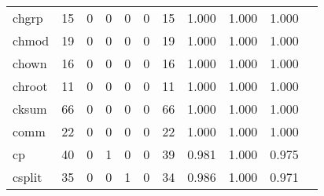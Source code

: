 \begin{longtable}{lp{1.10cm}p{1.10cm}p{1.10cm}p{1.10cm}p{1.10cm}p{1.10cm}p{1.10cm}p{1.10cm}p{1.10cm}p{1.10cm}}
chgrp     &                     15 &                                  0 &                                 0 &                                0 &                                 0 &                              15 &                          1.000 &                                 1.000 &                               1.000 \\
chmod     &                     19 &                                  0 &                                 0 &                                0 &                                 0 &                              19 &                          1.000 &                                 1.000 &                               1.000 \\
chown     &                     16 &                                  0 &                                 0 &                                0 &                                 0 &                              16 &                          1.000 &                                 1.000 &                               1.000 \\
chroot    &                     11 &                                  0 &                                 0 &                                0 &                                 0 &                              11 &                          1.000 &                                 1.000 &                               1.000 \\
cksum     &                     66 &                                  0 &                                 0 &                                0 &                                 0 &                              66 &                          1.000 &                                 1.000 &                               1.000 \\
comm      &                     22 &                                  0 &                                 0 &                                0 &                                 0 &                              22 &                          1.000 &                                 1.000 &                               1.000 \\
cp        &                     40 &                                  0 &                                 1 &                                0 &                                 0 &                              39 &                          0.981 &                                 1.000 &                               0.975 \\
csplit    &                     35 &                                  0 &                                 0 &                                1 &                                 0 &                              34 &                          0.986 &                                 1.000 &                               0.971 \\

\end{longtable}
